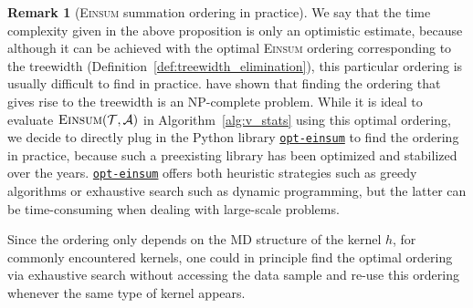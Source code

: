 \documentclass[sn-mathphys, natbib=false]{sn-jnl}
\newcommand{\libref}[2]{\href{#2}{\texttt{#1}}}
\def\package{\libref{u-stats}{https://github.com/zrq1706/U-Statistics-Python}}
\theoremstyle{plain}
\theoremstyle{definition}
\newtheorem{remark}{Remark}
\def\Einsum{\textsc{Einsum}}
\newcommand{\tensorcontraction}{\textsc{Einsum}}
\newif\ifshowchanges
\newcommand{\del}[1]{%
  \ifshowchanges
    {\color{red}\sout{#1}}%
  \fi
}
\def\package{\libref{u-stats}{https://github.com/zrq1706/U-Statistics-Python}}
\newcommand{\opteinsum}{\libref{opt-einsum}{https://dgasmith.github.io/opt_einsum/}}
\def\calA{\mathcal{A}}
\def\calT{\mathcal{T}}
\begin{document}
\begin{bibunit}[agsm]
\begin{remark}[\Einsum{} summation ordering in practice]
\label{rem:ordering}
We say that the time complexity given in the above proposition is only an optimistic estimate, because although it can be achieved with the optimal \Einsum{} ordering corresponding to the treewidth (Definition~\ref{def:treewidth_elimination}), this particular ordering is usually difficult to find in practice. \citet{arnborg1987complexity} have shown that finding the ordering that gives rise to the treewidth is an NP-complete problem. While it is ideal to evaluate $\tensorcontraction(\calT, \calA)$ in Algorithm~\ref{alg:v_stats} using this optimal ordering, we decide to directly plug in the Python library \opteinsum{} \citep{daniel2018opt} to find the ordering in practice, because such a preexisting library has been optimized and stabilized over the years. \opteinsum{} offers both heuristic strategies such as greedy algorithms or exhaustive search such as dynamic programming, but the latter can be time-consuming when dealing with large-scale problems. \del{As mentioned in the Introduction, dynamic programming is also used in \mbox{\citet{zhang2025adaptive}} for a special class of $U$-statistics.} Since the ordering only depends on the MD structure of the kernel $h$, for commonly encountered kernels, one could in principle find the optimal ordering via exhaustive search without accessing the data sample and re-use this ordering whenever the same type of kernel appears. %


\end{remark}


\end{bibunit}
\end{document}
